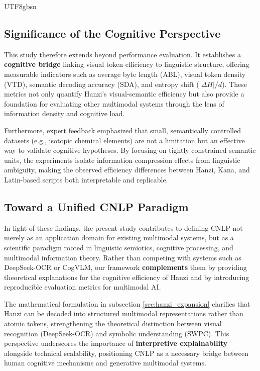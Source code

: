 \documentclass[conference]{IEEEtran}
\begin{document}
\begin{CJK*}{UTF8}{gbsn}
\subsection{Significance of the Cognitive Perspective}

This study therefore extends beyond performance evaluation. It establishes a \textbf{cognitive bridge} linking visual token efficiency to linguistic structure, offering measurable indicators such as average byte length (ABL), visual token density (VTD), semantic decoding accuracy (SDA), and entropy shift ($|\Delta H|/d$). These metrics not only quantify Hanzi’s visual-semantic efficiency but also provide a foundation for evaluating other multimodal systems through the lens of information density and cognitive load.

Furthermore, expert feedback emphasized that small, semantically controlled datasets (e.g., isotopic chemical elements) are not a limitation but an effective way to validate cognitive hypotheses. By focusing on tightly constrained semantic units, the experiments isolate information compression effects from linguistic ambiguity, making the observed efficiency differences between Hanzi, Kana, and Latin-based scripts both interpretable and replicable.

\subsection{Toward a Unified CNLP Paradigm}

In light of these findings, the present study contributes to defining CNLP not merely as an application domain for existing multimodal systems, but as a scientific paradigm rooted in linguistic semiotics, cognitive processing, and multimodal information theory. Rather than competing with systems such as DeepSeek-OCR or CogVLM, our framework \textbf{complements} them by providing theoretical explanations for the cognitive efficiency of Hanzi and by introducing reproducible evaluation metrics for multimodal AI.

The mathematical formulation in subsection \ref{sec:hanzi_expansion} clarifies that Hanzi can be decoded into structured multimodal representations rather than atomic tokens, strengthening the theoretical distinction between visual recognition (DeepSeek-OCR) and symbolic understanding (SWPC). This perspective underscores the importance of \textbf{interpretive explainability} alongside technical scalability, positioning CNLP as a necessary bridge between human cognitive mechanisms and generative multimodal systems.


\end{CJK*}
\end{document}
